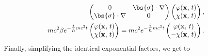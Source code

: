 \[\begin{aligned}
\begin{pmatrix}
                                                                                                                                         0                      & \bs{\sigma}\cdot\nabla \\
                                                                                                                                         \bs{\sigma}\cdot\nabla & 0
                                                                                                                                     \end{pmatrix}\begin{pmatrix}
                                                                                                                                                      \varphi(\mathbf{x},\,t) \\
                                                                                                                                                      \chi(\mathbf{x},\,t)
                                                                                                                                                  \end{pmatrix},                                           \\
        mc^2 \beta e^{-\tfrac{i}{\hbar} m c^2 t} \begin{pmatrix}
                                                     \varphi(\mathbf{x},\,t) \\
                                                     \chi(\mathbf{x},\,t)
                                                 \end{pmatrix} = mc^2 e^{-\tfrac{i}{\hbar} m c^2 t} \begin{pmatrix}
                                                                                                        \varphi(\mathbf{x},\,t) \\
                                                                                                        -\chi(\mathbf{x},\,t)
                                                                                                    \end{pmatrix}.
    \end{aligned}
\]
Finally, simplifying the identical exponential factors, we get to
